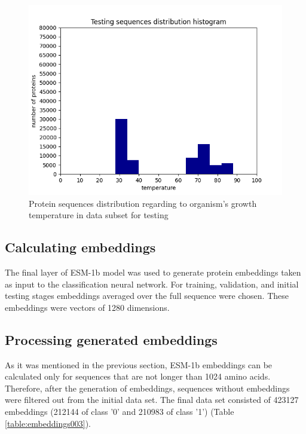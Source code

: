 \documentclass[12pt]{article}
\begin{document}
	\begin{figure}[h!]
		\centering
		\includegraphics[scale=0.75]{testing_v2_histo.png}

		\caption{Protein sequences distribution 
		regarding to organism's growth temperature
		in data subset for testing}
		\label{figure:testingHist003}
	\end{figure}

	\subsection{Calculating embeddings}

	The final layer of ESM-1b model was used to generate protein embeddings
	taken as input to the classification neural network. For training, validation,
	and initial testing stages embeddings averaged over the full sequence were
	chosen. These embeddings were vectors of 1280 dimensions.

	\subsection{Processing generated embeddings}

	As it was mentioned in the previous section, ESM-1b embeddings can be 
	calculated only for sequences that are not longer than 1024 amino acids.
	Therefore, after the generation of embeddings, sequences without embeddings 
	were filtered out from the initial data set. The final data set consisted
	of 423127 embeddings (212144 of class '0' and 210983 of class '1') (Table 
	\ref{table:embeddings003}).
\end{document}
